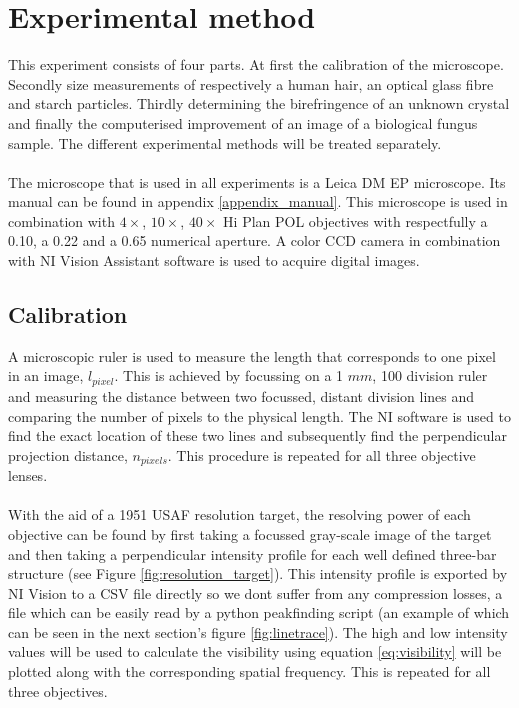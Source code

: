 \section{Experimental method}

This experiment consists of four parts. At first the calibration of the microscope. Secondly size measurements of respectively a human hair, an optical glass fibre and starch particles. Thirdly determining the birefringence of an unknown crystal and finally the computerised improvement of an image of a biological fungus sample. The different experimental methods will be treated separately.\\
\\
The microscope that is used in all experiments is a Leica DM EP microscope. Its manual can be found in appendix \ref{appendix_manual}. This microscope is used in combination with $4\times$, $10\times$, $40\times$ Hi Plan POL objectives with respectfully a 0.10, a 0.22 and a 0.65 numerical aperture. A color CCD camera in combination with NI Vision Assistant software is used to acquire digital images.

\subsection{Calibration}
\label{expmeth_calibration}

A microscopic ruler is used to measure the length that corresponds to one pixel in an image, $l_{pixel}$. This is achieved by focussing on a 1 $mm$, 100 division ruler and measuring the distance between two focussed, distant division lines and comparing the number of pixels to the physical length. The NI software is used to find the exact location of these two lines and subsequently find the perpendicular projection distance, $n_{pixels}$. This procedure is repeated for all three objective lenses.\\
\\
With the aid of a 1951 USAF resolution target, the resolving power of each objective can be found by first taking a focussed gray-scale image of the target and then taking a perpendicular intensity profile for each well defined three-bar structure (see Figure \ref{fig:resolution_target}). This intensity profile is exported by NI Vision to a CSV file directly so we dont suffer from any compression losses, a file which can be easily read by a python peakfinding script (an example of which can be seen in the next section's figure \ref{fig:linetrace}). The high and low intensity values will be used to calculate the visibility using equation \ref{eq:visibility} will be plotted along with the corresponding spatial frequency. This is repeated for all three objectives.\\


